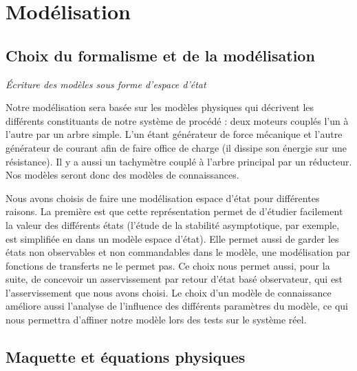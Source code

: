\chapter{Modélisation}
\label{chap:modelisation}

\section{Choix du formalisme et de la modélisation}
\textit{Écriture des modèles sous forme d'espace d'état}

Notre modélisation sera basée sur les modèles physiques qui décrivent les différents constituants de notre système de procédé : deux moteurs couplés l'un à l'autre par un arbre simple. L'un étant générateur de force mécanique et l'autre générateur de courant afin de faire office de charge (il dissipe son énergie sur une résistance). Il y a aussi un tachymètre couplé à l'arbre principal par un réducteur.
Nos modèles seront donc des modèles de connaissances.

Nous avons choisis de faire une modélisation espace d'état pour différentes raisons. La première est que cette représentation permet de d'étudier facilement la valeur des différents états (l'étude de la stabilité asymptotique, par exemple, est simplifiée en dans un modèle espace d'état). Elle permet aussi de garder les états non observables et non commandables dans le modèle, une modélisation par fonctions de transferts ne le permet pas. Ce choix nous permet aussi, pour la suite, de concevoir un asservissement par retour d'état basé observateur, qui est l'asservissement que nous avons choisi. Le choix d'un modèle de connaissance améliore aussi l'analyse de l'influence des différents paramètres du modèle, ce qui nous permettra d'affiner notre modèle lors des tests sur le système réel. 



\section{Maquette et équations physiques}
